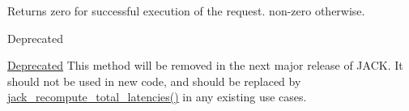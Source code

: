 \begin{DoxyReturn}{\-Returns}
zero for successful execution of the request. non-\/zero otherwise.
\end{DoxyReturn}
\begin{DoxyRefDesc}{\-Deprecated}
\item[\hyperlink{deprecated__deprecated000011}{\-Deprecated}]\-This method will be removed in the next major release of \-J\-A\-C\-K. \-It should not be used in new code, and should be replaced by \hyperlink{group__LatencyFunctions_ga46400b9a573389549784a356ab2d4e3b}{jack\-\_\-recompute\-\_\-total\-\_\-latencies()} in any existing use cases. \end{DoxyRefDesc}
